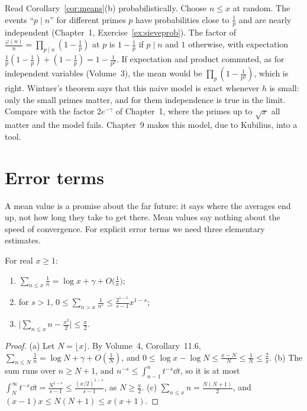 \begin{beauty}
Read Corollary~\ref{cor:means}(b) probabilistically. Choose $n\le x$ at random. The events ``$p\mid n$'' for different primes $p$ have
probabilities close to $\frac1p$ and are nearly independent (Chapter~1, Exercise~\ref{ex:sieveprob}). The factor of $\frac{\varphi(n)}n=\prod_{p\mid n}(1-\frac1p)$
at $p$ is $1-\frac1p$ if $p\mid n$ and $1$ otherwise, with expectation $\frac1p(1-\frac1p)+(1-\frac1p)=1-\frac1{p^2}$. If expectation and product
commuted, as for independent variables (Volume~3), the mean would be $\prod_p(1-\frac1{p^2})$, which is right. Wintner's theorem says
that this naive model is exact whenever $h$ is small: only the small primes matter, and for them independence is true in the limit.
Compare with the factor $2e^{-\gamma}$ of Chapter~1, where the primes up to $\sqrt x$ all matter and the model fails. Chapter~9 makes
this model, due to Kubilius, into a tool.
\end{beauty}

\section{Error terms}

A mean value is a promise about the far future: it says where the averages end up, not how long they take to get there. Mean values say nothing about the speed of convergence. For explicit error terms we need three elementary estimates.

\begin{lemma}\label{lem:elemsums}
For real $x\ge1$:
\begin{enumerate}[label=(\alph*)]
\item $\sum_{n\le x}\frac1n=\log x+\gamma+O\bigl(\frac1x\bigr)$;
\item for $s>1$, $0\le\sum_{n>x}\frac1{n^s}\le\frac{2^{s-1}}{s-1}x^{1-s}$;
\item $\bigl|\sum_{n\le x}n-\frac{x^2}2\bigr|\le\frac x2$.
\end{enumerate}
\end{lemma}
\begin{proof}
(a) Let $N=\lfloor x\rfloor$. By Volume~4, Corollary~11.6, $\sum_{n\le N}\frac1n=\log N+\gamma+O(\frac1N)$, and $0\le\log x-\log N\le\frac{x-N}N\le\frac1N\le\frac2x$.
(b) The sum runs over $n\ge N+1$, and $n^{-s}\le\int_{n-1}^nt^{-s}\dd t$, so it is at most $\int_N^\infty t^{-s}\dd t=\frac{N^{1-s}}{s-1}\le\frac{(x/2)^{1-s}}{s-1}$, as $N\ge\frac x2$.
(c) $\sum_{n\le x}n=\frac{N(N+1)}2$, and $(x-1)x\le N(N+1)\le x(x+1)$.
\end{proof}

